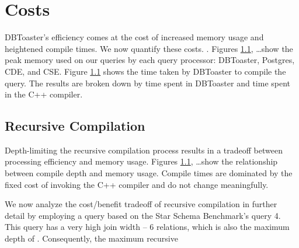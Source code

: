 
\section{Costs}
DBToaster's efficiency comes at the cost of increased memory usage and heightened compile times.  We now quantify these costs.  .  Figures \ref{}, \ldots show the peak memory used on our queries by each query processor: DBToaster, Postgres, CDE, and CSE.  Figure \ref{} shows the time taken by DBToaster to compile the query.  The results are  broken down by time spent in DBToaster  and time spent in the C++ compiler.


\subsection{Recursive Compilation}
Depth-limiting the recursive compilation process results in a tradeoff between processing efficiency and memory usage.  Figures \ref{}, \ldots show the relationship between compile depth and memory usage.  Compile times are dominated by the fixed cost of invoking the C++ compiler  and do not change meaningfully.


We now analyze the cost/benefit tradeoff of recursive compilation in further detail by employing a query based on the Star Schema Benchmark's\cite{} query 4.  This query has a very high join width -- 6 relations, which is also the maximum depth of .  Consequently, the maximum recursive 


